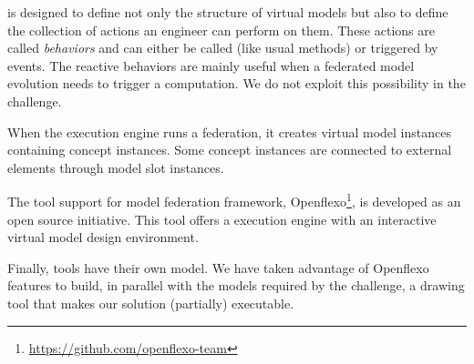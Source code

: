 \FML is designed to define not only the structure of virtual models but
also to define the collection of actions an engineer can perform on
them. These actions are called \emph{behaviors} and can either be called (like usual methods) or triggered by events. The reactive behaviors are mainly useful when a federated model evolution needs to trigger a computation. We do not
exploit this possibility in the challenge.


When the \FML execution engine runs a federation, it creates virtual
model instances containing concept instances. Some concept instances
are connected to external elements through model slot instances.


The tool support for model federation framework,
Openflexo\footnote{\url{https://github.com/openflexo-team}}, is
developed as an open source initiative. This tool offers a \FML
execution engine with an interactive virtual model design environment.

Finally, tools have their own model. We have taken advantage of
Openflexo features to build, in parallel with the models  required by the challenge, a drawing tool that makes our
solution (partially) executable.
